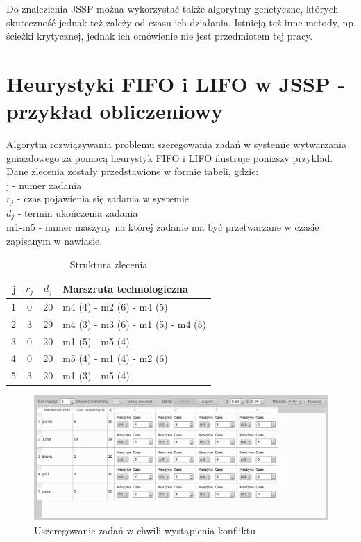 \documentclass[twoside]{kInzynierka}
\begin{document}
Do znalezienia JSSP można wykorzystać także algorytmy genetyczne, których skuteczność jednak też zależy od czasu ich działania. Istnieją też inne metody, np. ścieżki krytycznej, jednak ich omówienie nie jest przedmiotem tej pracy.

\section        [Heurystyki FIFO i LIFO \ldots]
                {Heurystyki FIFO i LIFO w JSSP \newlineTekst - przykład obliczeniowy}
Algorytm rozwiązywania problemu szeregowania zadań w systemie wytwarzania gniazdowego za pomocą heurystyk FIFO i LIFO ilustruje poniższy przykład. Dane zlecenia zostały przedstawione w formie tabeli, gdzie: \\
j - numer zadania \\
\(r_j\) - czas pojawienia się zadania w systemie \\
\(d_j\) - termin ukończenia zadania \\
m1-m5 - numer maszyny na której zadanie ma być przetwarzane w czasie zapisanym w nawiasie.
\begin{table}[htb]
	\centering
	\begin{tabular}{ | r | c | c | l | }
	\hline
	j	& \(r_j\)	& \(d_j\)	& Marszruta technologiczna	\\ \hline
	1	& 0	& 20	& m4 (4) - m2 (6) - m4 (5)	\\ \hline
	2	& 3	& 29	& m4 (3) - m3 (6) - m1 (5) - m4 (5)	\\ \hline
	3	& 0	& 20	& m1 (5) - m5 (4)	\\ \hline
	4	& 0	& 20	& m5 (4) - m1 (4) - m2 (6)	\\ \hline
	5	& 3	& 20	& m1 (3) - m5 (4)	\\ \hline
	\end{tabular}
	\caption{Struktura zlecenia}
\end{table}




\begin{figure}[htb]
    \centering
    \includegraphics[width=\textwidth, keepaspectratio=true]{./obrazki/main}
    \caption{Uszeregowanie zadań w chwili wystąpienia konfliktu}
\end{figure}
\end{document}
